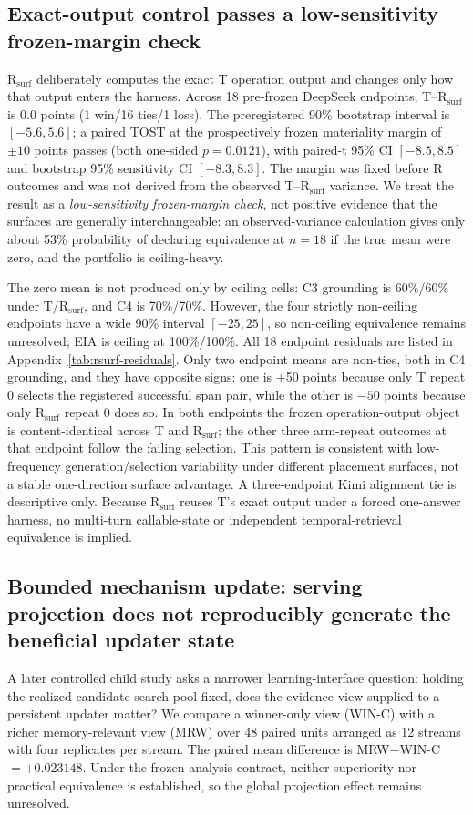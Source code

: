 \subsection{Exact-output control passes a low-sensitivity frozen-margin check}
R$_{\mathrm{surf}}$ deliberately computes the exact T operation output and changes only how that output enters the harness. Across 18 pre-frozen DeepSeek endpoints, T--R$_{\mathrm{surf}}$ is 0.0 points (1 win/16 ties/1 loss). The preregistered 90\% bootstrap interval is $[-5.6,5.6]$; a paired TOST at the prospectively frozen materiality margin of $\pm10$ points passes (both one-sided $p=0.0121$), with paired-t 95\% CI $[-8.5,8.5]$ and bootstrap 95\% sensitivity CI $[-8.3,8.3]$. The margin was fixed before R outcomes and was not derived from the observed T--R$_{\mathrm{surf}}$ variance. We treat the result as a \emph{low-sensitivity frozen-margin check}, not positive evidence that the surfaces are generally interchangeable: an observed-variance calculation gives only about 53\% probability of declaring equivalence at $n=18$ if the true mean were zero, and the portfolio is ceiling-heavy.

The zero mean is not produced only by ceiling cells: C3 grounding is 60\%/60\% under T/R$_{\mathrm{surf}}$, and C4 is 70\%/70\%. However, the four strictly non-ceiling endpoints have a wide 90\% interval $[-25,25]$, so non-ceiling equivalence remains unresolved; EIA is ceiling at 100\%/100\%. All 18 endpoint residuals are listed in Appendix~\ref{tab:rsurf-residuals}. Only two endpoint means are non-ties, both in C4 grounding, and they have opposite signs: one is +50 points because only T repeat 0 selects the registered successful span pair, while the other is $-50$ points because only R$_{\mathrm{surf}}$ repeat 0 does so. In both endpoints the frozen operation-output object is content-identical across T and R$_{\mathrm{surf}}$; the other three arm-repeat outcomes at that endpoint follow the failing selection. This pattern is consistent with low-frequency generation/selection variability under different placement surfaces, not a stable one-direction surface advantage. A three-endpoint Kimi alignment tie is descriptive only. Because R$_{\mathrm{surf}}$ reuses T's exact output under a forced one-answer harness, no multi-turn callable-state or independent temporal-retrieval equivalence is implied.

\subsection{Bounded mechanism update: serving projection does not reproducibly generate the beneficial updater state}
\label{sec:r17-bounded}
A later controlled child study asks a narrower learning-interface question: holding the realized candidate search pool fixed, does the evidence view supplied to a persistent updater matter? We compare a winner-only view (WIN-C) with a richer memory-relevant view (MRW) over 48 paired units arranged as 12 streams with four replicates per stream. The paired mean difference is MRW$-$WIN-C $=+0.023148$. Under the frozen analysis contract, neither superiority nor practical equivalence is established, so the global projection effect remains unresolved.

